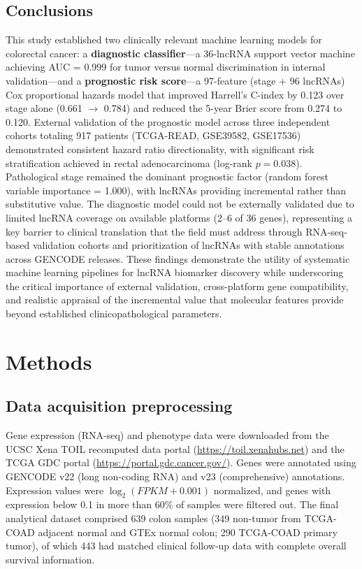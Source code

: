 \documentclass[fleqn,10pt]{wlscirep}
\begin{document}
\subsection*{Conclusions}

This study established two clinically relevant machine learning models for colorectal cancer: a \textbf{diagnostic classifier}—a 36-lncRNA support vector machine achieving AUC = 0.999 for tumor versus normal discrimination in internal validation—and a \textbf{prognostic risk score}—a 97-feature (stage + 96 lncRNAs) Cox proportional hazards model that improved Harrell's C-index by 0.123 over stage alone (0.661 $\rightarrow$ 0.784) and reduced the 5-year Brier score from 0.274 to 0.120. External validation of the prognostic model across three independent cohorts totaling 917 patients (TCGA-READ, GSE39582, GSE17536) demonstrated consistent hazard ratio directionality, with significant risk stratification achieved in rectal adenocarcinoma (log-rank $p = 0.038$). Pathological stage remained the dominant prognostic factor (random forest variable importance = 1.000), with lncRNAs providing incremental rather than substitutive value. The diagnostic model could not be externally validated due to limited lncRNA coverage on available platforms (2--6 of 36 genes), representing a key barrier to clinical translation that the field must address through RNA-seq-based validation cohorts and prioritization of lncRNAs with stable annotations across GENCODE releases. These findings demonstrate the utility of systematic machine learning pipelines for lncRNA biomarker discovery while underscoring the critical importance of external validation, cross-platform gene compatibility, and realistic appraisal of the incremental value that molecular features provide beyond established clinicopathological parameters.

\section*{Methods}

\subsection*{Data acquisition preprocessing}
Gene expression (RNA-seq) and phenotype data were downloaded from the UCSC Xena TOIL recomputed data portal (\url{https://toil.xenahubs.net}) and the TCGA GDC portal (\url{https://portal.gdc.cancer.gov/}). Genes were annotated using GENCODE v22 (long non-coding RNA) and v23 (comprehensive) annotations. Expression values were $\log_{2}(FPKM+0.001)$ normalized, and genes with expression below 0.1 in more than 60\% of samples were filtered out. The final analytical dataset comprised 639 colon samples (349 non-tumor from TCGA-COAD adjacent normal and GTEx normal colon; 290 TCGA-COAD primary tumor), of which 443 had matched clinical follow-up data with complete overall survival information.
\end{document}
